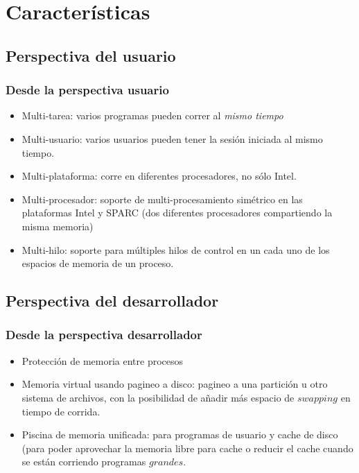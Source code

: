 \documentclass[spanish]{beamer}
\begin{document}
  	\section{Caracter\'{i}sticas}
	\subsection{Perspectiva del usuario}
  \frame
  {
    \frametitle{Desde la perspectiva usuario}

    \begin{itemize}
      \item Multi-tarea: varios programas pueden correr al \textit{mismo tiempo}
      \item Multi-usuario: varios usuarios pueden tener la sesión iniciada al mismo tiempo.
      \item Multi-plataforma: corre en diferentes procesadores, no sólo Intel.
      \item Multi-procesador: soporte de multi-procesamiento simétrico en las plataformas Intel y SPARC (dos diferentes procesadores compartiendo la misma memoria)
      \item Multi-hilo: soporte para múltiples hilos de control en un cada uno de los espacios de memoria de un proceso.
    \end{itemize}
  }

    \subsection{Perspectiva del desarrollador}
  \frame
  {
    \frametitle{Desde la perspectiva desarrollador}    
    \begin{itemize}
    \item Protección de memoria entre procesos
    \item Memoria virtual usando pagineo a disco: pagineo a una partición u otro sistema de archivos, con la posibilidad de añadir más espacio de $swapping$ en tiempo de corrida.
    \item Piscina de memoria unificada: para programas de usuario y cache de disco (para poder aprovechar la memoria libre para cache o reducir el cache cuando se están corriendo programas $grandes$.
    \end{itemize}
  }

\end{document}
